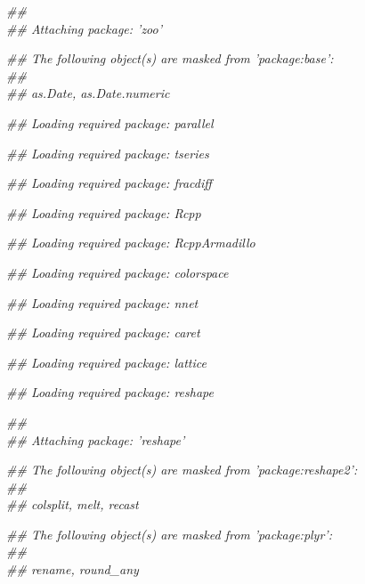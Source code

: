 \documentclass[11pt]{article}\usepackage{graphicx, color}
\makeatletter
\newenvironment{kframe}{%
 \def\at@end@of@kframe{}%
 \ifinner\ifhmode%
  \def\at@end@of@kframe{\end{minipage}}%
  \begin{minipage}{\columnwidth}%
 \fi\fi%
 \def\FrameCommand##1{\hskip\@totalleftmargin \hskip-\fboxsep
 \colorbox{shadecolor}{##1}\hskip-\fboxsep
     \hskip-\linewidth \hskip-\@totalleftmargin \hskip\columnwidth}%
 \MakeFramed {\advance\hsize-\width
   \@totalleftmargin\z@ \linewidth\hsize
   \@setminipage}}%
 {\par\unskip\endMakeFramed%
 \at@end@of@kframe}
\newenvironment{knitrout}{}{} %
\makeatother
\begin{document}
\begin{knitrout}
\color{fgcolor}\begin{kframe}


{\ttfamily\noindent\itshape\textcolor{messagecolor}{\#\# \\\#\# Attaching package: 'zoo'}}

{\ttfamily\noindent\itshape\textcolor{messagecolor}{\#\# The following object(s) are masked from 'package:base':\\\#\# \\\#\#     as.Date, as.Date.numeric}}

{\ttfamily\noindent\itshape\textcolor{messagecolor}{\#\# Loading required package: parallel}}

{\ttfamily\noindent\itshape\textcolor{messagecolor}{\#\# Loading required package: tseries}}

{\ttfamily\noindent\itshape\textcolor{messagecolor}{\#\# Loading required package: fracdiff}}

{\ttfamily\noindent\itshape\textcolor{messagecolor}{\#\# Loading required package: Rcpp}}

{\ttfamily\noindent\itshape\textcolor{messagecolor}{\#\# Loading required package: RcppArmadillo}}

{\ttfamily\noindent\itshape\textcolor{messagecolor}{\#\# Loading required package: colorspace}}

{\ttfamily\noindent\itshape\textcolor{messagecolor}{\#\# Loading required package: nnet}}

{\ttfamily\noindent\itshape\textcolor{messagecolor}{\#\# Loading required package: caret}}

{\ttfamily\noindent\itshape\textcolor{messagecolor}{\#\# Loading required package: lattice}}

{\ttfamily\noindent\itshape\textcolor{messagecolor}{\#\# Loading required package: reshape}}

{\ttfamily\noindent\itshape\textcolor{messagecolor}{\#\# \\\#\# Attaching package: 'reshape'}}

{\ttfamily\noindent\itshape\textcolor{messagecolor}{\#\# The following object(s) are masked from 'package:reshape2':\\\#\# \\\#\#     colsplit, melt, recast}}

{\ttfamily\noindent\itshape\textcolor{messagecolor}{\#\# The following object(s) are masked from 'package:plyr':\\\#\# \\\#\#     rename, round\_any}}


\end{kframe}
\end{knitrout}
\end{document}

